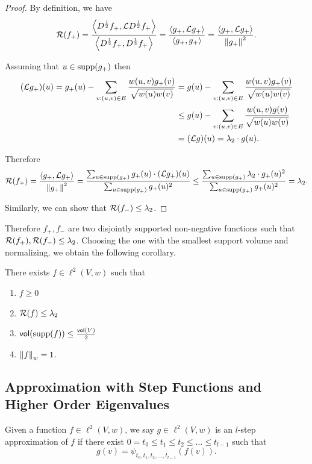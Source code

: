 \documentclass[11pt]{article}
\begin{document}
\begin{proof}
    By definition, we have
    \begin{equation*}
        \mathcal{R}(f_+) = \frac{\left\langle{D^{\frac{1}{2}} f_+},{\mathcal{L} D^{\frac{1}{2}} f_+}\right\rangle}{\left\langle{D^{\frac{1}{2}}f_+},{D^{\frac{1}{2}}f_+}\right\rangle} = \frac{\left\langle{g_+},{\mathcal{L} g_+}\right\rangle}{\left\langle{g_+},{g_+}\right\rangle} = \frac{\left\langle{g_+},{\mathcal{L} g_+}\right\rangle}{\left\lVert g_+ \right\rVert^2}.
    \end{equation*}

    Assuming that $u \in \mathrm{supp}({g_+})$ then
    \begin{align*}
        (\mathcal{L} g_+)(u) = g_+(u) - \sum_{v: (u, v) \in E} \frac{w(u, v) g_+(v)}{\sqrt{w(u)w(v)}} &= g(u) -  \sum_{v: (u, v) \in E} \frac{w(u, v) g_+(v)}{\sqrt{w(u)w(v)}} \\
        &\leq g(u) -  \sum_{v: (u, v) \in E} \frac{w(u, v) g(v)}{\sqrt{w(u)w(v)}} \\
        &= (\mathcal{L} g)(u) = \lambda_2 \cdot g(u).
    \end{align*}
    
    Therefore
    \begin{equation*}
        \mathcal{R}(f_+) = \frac{\left\langle{g_+},{\mathcal{L} g_+}\right\rangle}{\left\lVert g_+ \right\rVert^2} = \frac{\sum_{u \in \mathrm{supp}({g_+})} g_+(u) \cdot (\mathcal{L} g_+)(u)}{\sum_{u \in \mathrm{supp}({g_+})} g_+(u)^2} \leq 
        \frac{\sum_{u \in \mathrm{supp}({g_+})} \lambda_2 \cdot g_+(u)^2}{\sum_{u \in \mathrm{supp}({g_+})} g_+(u)^2} = \lambda_2.
    \end{equation*}

    Similarly, we can show that $\mathcal{R}(f_-) \leq \lambda_2$. 
\end{proof}

Therefore $f_+, f_-$ are two disjointly supported non-negative functions such that $\mathcal{R}(f_+),\mathcal{R}(f_-) \leq \lambda_2$. Choosing the one with the smallest support volume and normalizing, we obtain the following corollary.
\begin{corollary}\label{cor:good_f}
    There exists $f \in \ell^2(V,w)$ such that
    \begin{enumerate}
        \item $f \geq 0$
        \item $\mathcal{R}(f) \leq \lambda_2$ 
        \item $\operatorname{\mathsf{vol}}(\mathrm{supp}({f})) \leq \frac{\operatorname{\mathsf{vol}}(V)}{2}$
        \item $\left\lVert f \right\rVert_w = 1$.
    \end{enumerate}
\end{corollary}


\subsection{Approximation with Step Functions and Higher Order Eigenvalues}
\begin{definition}
    Given a function $f \in \ell^2(V,w)$, we say $g \in \ell^2(V,w)$ is an $l$-step approximation of $f$ if there exist $0 = t_0 \leq t_1 \leq  t_2 \leq \dots \leq t_{l-1}$ such that 
    \begin{equation*}
        g(v) = \psi_{t_0, t_1, t_2, \dots, t_{l-1}}(f(v)).
    \end{equation*}
\end{definition}
\end{document}
